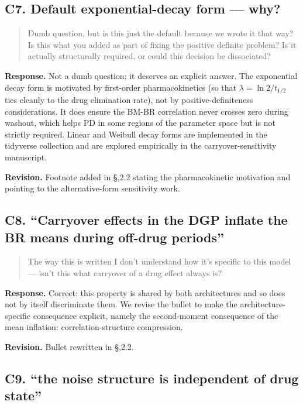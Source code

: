 \documentclass[
]{article}
\begin{document}
\subsection*{C7. Default exponential-decay form --- why?}

\begin{quote}
Dumb question, but is this just the default because we wrote it
that way? Is this what you added as part of fixing the positive
definite problem? Is it actually structurally required, or could
this decision be dissociated?
\end{quote}

\textbf{Response.} Not a dumb question; it deserves an explicit
answer. The exponential decay form is motivated by first-order
pharmacokinetics (so that
\(\lambda = \ln 2 / t_{1/2}\) ties cleanly to the drug elimination
rate), not by positive-definiteness considerations. It does ensure
the BM-BR correlation never crosses zero during washout, which
helps PD in some regions of the parameter space but is not strictly
required. Linear and Weibull decay forms are implemented in the
tidyverse collection and are explored empirically in the
carryover-sensitivity manuscript.

\textbf{Revision.} Footnote added in \S,2.2 stating the
pharmacokinetic motivation and pointing to the alternative-form
sensitivity work.

\subsection*{C8. ``Carryover effects in the DGP inflate the BR
means during off-drug periods''}

\begin{quote}
The way this is written I don't understand how it's specific to
this model --- isn't this what carryover of a drug effect always is?
\end{quote}

\textbf{Response.} Correct: this property is shared by both
architectures and so does not by itself discriminate them. We
revise the bullet to make the architecture-specific consequence
explicit, namely the second-moment consequence of the mean
inflation: correlation-structure compression.

\textbf{Revision.} Bullet rewritten in \S,2.2.

\subsection*{C9. ``the noise structure is independent of drug
state''}
\end{document}
